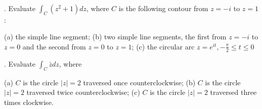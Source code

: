. Evaluate $ \int_{C} (z^2 +1) dz$, where $C$ is the following contour from $z=-i$ to $z=1$:

(a) the simple line segment; (b) two simple line segments, the first from $z=-i$ to $z=0$ and the second from $z=0$ to $z=1$; (c) the circular arc $ z= e^{it}, -\frac{\pi}{2} \leq t \leq 0 $


\medskip

. Evaluate  $ \int_{C} \bar{z} dz $, where

(a) $C$ is the circle   $ |z|=2$ traversed once counterclockwise; (b) $C$ is the circle   $ |z|=2$ traversed twice counterclockwise; (c) $C$ is the circle   $ |z|=2$ traversed three times clockwise.










